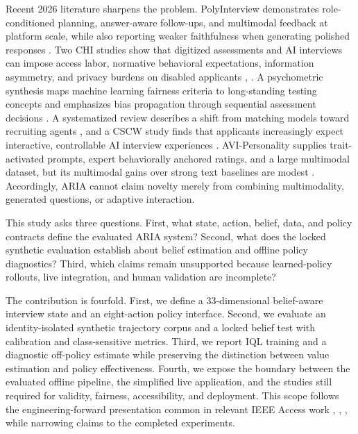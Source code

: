 \documentclass[journal]{IEEEtran}
\begin{document}
Recent 2026 literature sharpens the problem. PolyInterview demonstrates role-conditioned planning, answer-aware follow-ups, and multimodal feedback at platform scale, while also reporting weaker faithfulness when generating polished responses \cite{wen2026polyinterview}. Two CHI studies show that digitized assessments and AI interviews can impose access labor, normative behavioral expectations, information asymmetry, and privacy burdens on disabled applicants \cite{luria2026disability}, \cite{kameswaran2026surveilling}. A psychometric synthesis maps machine learning fairness criteria to long-standing testing concepts and emphasizes bias propagation through sequential assessment decisions \cite{cheng2026fairness}. A systematized review describes a shift from matching models toward recruiting agents \cite{zhao2026recruitingagents}, and a CSCW study finds that applicants increasingly expect interactive, controllable AI interview experiences \cite{sakib2026expecting}. AVI-Personality supplies trait-activated prompts, expert behaviorally anchored ratings, and a large multimodal dataset, but its multimodal gains over strong text baselines are modest \cite{zhang2026avipersonality}. Accordingly, ARIA cannot claim novelty merely from combining multimodality, generated questions, or adaptive interaction.


This study asks three questions. First, what state, action, belief, data, and policy contracts define the evaluated ARIA system? Second, what does the locked synthetic evaluation establish about belief estimation and offline policy diagnostics? Third, which claims remain unsupported because learned-policy rollouts, live integration, and human validation are incomplete?


The contribution is fourfold. First, we define a 33-dimensional belief-aware interview state and an eight-action policy interface. Second, we evaluate an identity-isolated synthetic trajectory corpus and a locked belief test with calibration and class-sensitive metrics. Third, we report IQL training and a diagnostic off-policy estimate while preserving the distinction between value estimation and policy effectiveness. Fourth, we expose the boundary between the evaluated offline pipeline, the simplified live application, and the studies still required for validity, fairness, accessibility, and deployment. This scope follows the engineering-forward presentation common in relevant IEEE Access work \cite{kim2023fairness}, \cite{putra2024magbert}, \cite{suen2019personality}, while narrowing claims to the completed experiments.
\end{document}
